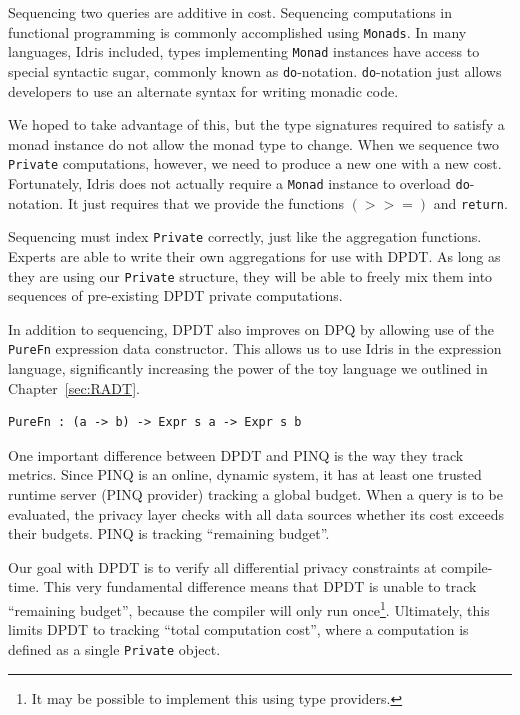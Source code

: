 \documentclass[12pt]{report}
\begin{document}
Sequencing two queries are additive in cost.
Sequencing computations in functional programming is commonly accomplished using \texttt{Monads}.
In many languages, Idris included, types implementing \texttt{Monad} instances have access to special syntactic sugar, commonly known as \texttt{do}-notation.
\texttt{do}-notation just allows developers to use an alternate syntax for writing monadic code.

We hoped to take advantage of this, but the type signatures required to satisfy a monad instance do not allow the monad type to change.
When we sequence two \texttt{Private} computations, however, we need to produce a new one with a new cost.
Fortunately, Idris does not actually require a \texttt{Monad} instance to overload \texttt{do}-notation.
It just requires that we provide the functions \texttt{$(>>=)$} and \texttt{return}.

Sequencing must index \texttt{Private} correctly, just like the aggregation functions.
Experts are able to write their own aggregations for use with DPDT.
As long as they are using our \texttt{Private} structure, they will be able to freely mix them into sequences of pre-existing DPDT private computations.

In addition to sequencing, DPDT also improves on DPQ by allowing use of the \texttt{PureFn} expression data constructor.
This allows us to use Idris in the expression language, significantly increasing the power of the toy language we outlined in Chapter~\ref{sec:RADT}.

\begin{lstlisting}[float,caption={PureFn expression constructor}, label={lst:purefn}]
PureFn : (a -> b) -> Expr s a -> Expr s b
\end{lstlisting}

One important difference between DPDT and PINQ is the way they track metrics.
Since PINQ is an online, dynamic system, it has at least one trusted runtime server (PINQ provider) tracking a global budget.
When a query is to be evaluated, the privacy layer checks with all data sources whether its cost exceeds their budgets.
PINQ is tracking ``remaining budget''.

Our goal with DPDT is to verify all differential privacy constraints at compile-time.
This very fundamental difference means that DPDT is unable to track ``remaining budget'', because the compiler will only run once\footnote{It may be possible to implement this using type providers.}.
Ultimately, this limits DPDT to tracking ``total computation cost'', where a computation is defined as a single \texttt{Private} object.
\end{document}
